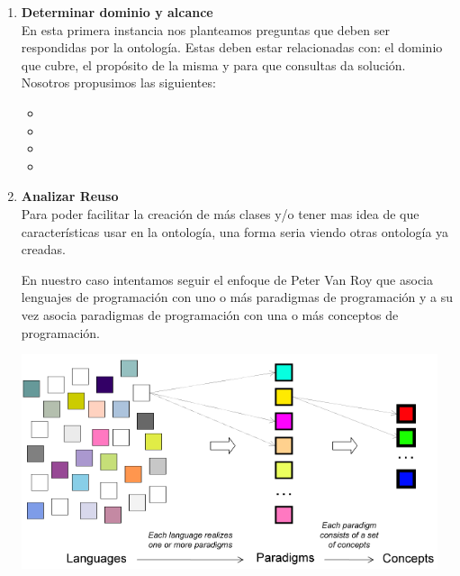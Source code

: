 \documentclass[12pt, titlepage, a4paper]{article}
\begin{document}
\begin{enumerate}
    \item {\textbf{Determinar dominio y alcance}\\
           En esta primera instancia nos planteamos preguntas que deben 
           ser respondidas por la ontología. Estas deben estar relacionadas 
           con: el dominio que cubre, el propósito de la misma y para que 
           consultas da solución. Nosotros propusimos las siguientes:
           \begin{itemize}
                \item {}
                \item {}
                \item {} 
                \item {}
           \end{itemize}}
    \item {\textbf{Analizar Reuso}\\
           Para poder facilitar la creación de más clases y/o tener mas 
           idea de que características usar en la ontología, una 
           forma seria viendo otras ontología ya creadas.

           En nuestro caso intentamos seguir el enfoque de Peter Van Roy\cite{vanroy} que
           asocia lenguajes de programación con uno o más paradigmas de programación
           y a su vez asocia paradigmas de programación con una o más conceptos de programación.\\

           \begin{center}
            \includegraphics[scale=0.75]{Imagenes/lenguajesParadigmasConceptos.png}
           \end{center}

}
\end{enumerate}
\end{document}
